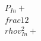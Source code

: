 \documentclass[preview]{standalone}
\begin{document}
\begin{align*}
P_{In} + \\frac{1}{2} \\rho v_{In}^2 +
\end{align*}
\end{document}
